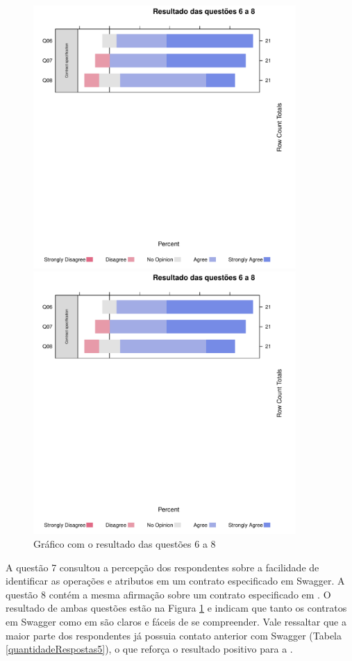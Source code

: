 \begin{figure}[!htb]
\centering
\includegraphics[width=100mm,trim = 6mm 115mm 6mm 
10mm,clip]{img/GraficoResultadoQuestoes6a8.pdf}

\includegraphics[width=100mm,trim = 6mm 0mm 6mm 
170mm,clip]{img/GraficoResultadoQuestoes6a8.pdf}

\caption{Gráfico com o resultado das questões 6 a 8}
\label{Respostas6a8}
\end{figure}

A questão 7 consultou a percepção dos respondentes sobre a facilidade de
identificar as operações e atributos em um contrato especificado em Swagger. A
questão 8 contém a mesma afirmação sobre um contrato especificado em \neoidl{}.
O resultado de ambas questões estão na Figura \ref{Respostas6a8} e indicam que
tanto os contratos em Swagger como em \neoidl{} são claros e fáceis de se compreender. Vale ressaltar que a maior parte dos
respondentes já possuia contato anterior com Swagger (Tabela
\ref{quantidadeRespostas5}), o que reforça o resultado positivo para a
\neoidl{}.


